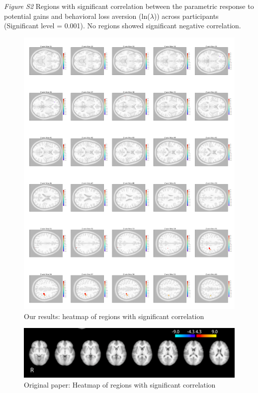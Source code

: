 \documentclass[11pt]{article}
\begin{document}
\emph{Figure S2} Regions with significant correlation between the parametric response to potential gains and behavioral loss aversion (ln($\lambda$)) across participants (Significant level = 0.001).  No regions showed significant negative correlation.

\begin{figure}[H]\label{sig_cor_z_gain}
    \centering
        \includegraphics[scale=0.105]{figures/Regression3/sig_cor_z_gain.png}
    \caption{Our results: heatmap of regions with significant correlation}
\end{figure}

\begin{figure}[H]
    \centering
        \includegraphics[scale=0.5]{figures/Regression3/Orig_sig_cor_z_gain.png}
    \caption{Original paper: Heatmap of regions with significant correlation}
\end{figure}
\end{document}
